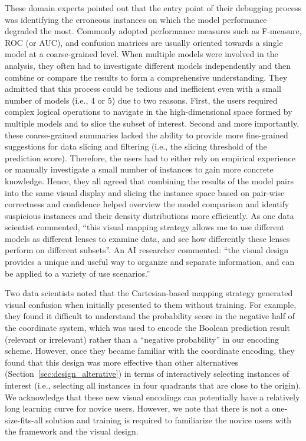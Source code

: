 \documentclass[preprint,journal]{vgtc}       %
\begin{document}
These domain experts pointed out that the entry point of their debugging process was identifying the erroneous instances on which the model performance degraded the most. Commonly adopted performance measures such as F-measure, ROC (or AUC), and confusion matrices are usually oriented towards a single model at a coarse-grained level.
When multiple models were involved in the analysis, they often had to investigate different models independently and then combine or compare the results to form a comprehensive understanding. They admitted that this process could be tedious and inefficient even with a small number of models (i.e., 4 or 5) due to two reasons. First, the users required complex logical operations to navigate in the high-dimensional space formed by multiple models and to slice the subset of interest. Second and more importantly, these coarse-grained summaries lacked the ability to provide more fine-grained suggestions for data slicing and filtering (i.e., the slicing threshold of the prediction score). Therefore, the users had to either rely on empirical experience or manually investigate a small number of instances to gain more concrete knowledge. Hence, they all agreed that combining the results of the model pairs into the same visual display and slicing the instance space based on pair-wise correctness and confidence helped overview the model comparison and identify suspicious instances and their density distributions more efficiently. As one data scientist commented, ``this visual mapping strategy allows me to use different models as different lenses to examine data, and see how differently these lenses perform on different subsets''. An AI researcher commented: ``the visual design provides a unique and useful way to organize and separate information, and can be applied to a variety of use scenarios.''

Two data scientists noted that the Cartesian-based mapping strategy generated visual confusion when initially presented to them without training. For example, they found it difficult to understand the probability score in the negative half of the coordinate system, which was used to encode the Boolean prediction result (relevant or irrelevant) rather than a ``negative probability'' in our encoding scheme. However, once they became familiar with the coordinate encoding, they found that this design was more effective than other alternatives (Section~\ref{sec:design_alterative}) in terms of interactively selecting instances of interest (i.e., selecting all instances in four quadrants that are close to the origin). We acknowledge that these new visual encodings can potentially have a relatively long learning curve for novice users. However, we note that there is not a one-size-fits-all solution and training is required to familiarize the novice users with the framework and the visual design.
\end{document}
